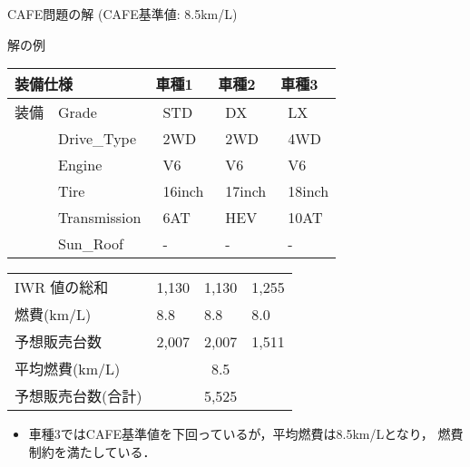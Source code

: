 \documentclass[dvipdfmx, 11pt]{beamer}
\begin{document}
\begin{frame}{CAFE問題の解 {\normalsize (CAFE基準値: 8.5km/L)}}\small
 \begin{exampleblock}{解の例}
  \centering
  \renewcommand{\arraystretch}{0.9}
  \begin{tabular}{p{10mm}|p{25mm}|p{15mm}|p{15mm}|p{15mm}} 
   \multicolumn{2}{l|}{装備仕様}  & 車種1 & 車種2 & 車種3 \\\hline
   装備 & Grade  & \ STD & \ DX  & \ LX\\
   &Drive\_Type  & \ 2WD    & \ 2WD    & \ 4WD\\
   &Engine	     & \ V6      & \ V6     & \ V6\\
   &Tire	     & \ 16inch & \ 17inch & \ 18inch\\
   &Transmission & \ 6AT     & \ HEV     & \ 10AT\\
   &Sun\_Roof    & \ -               & \ -   & \ -  
  \end{tabular}
 \end{exampleblock}

 \pause

 \begin{block}{}
  \centering
  \renewcommand{\arraystretch}{0.9}
  \begin{tabular}{p{38mm}|p{15mm}|p{15mm}|p{15mm}} 
   IWR 値の総和           & 1,130  & 1,130   & 1,255 \\ %
   燃費(km/L)      & 8.8  & 8.8     & 8.0 \\ %
   予想販売台数    & 2,007   & 2,007   & 1,511  \\ \hline
   平均燃費(km/L)  & \multicolumn{3}{c}{8.5} \\ 
   予想販売台数(合計)  & \multicolumn{3}{c}{5,525} 
  \end{tabular}
 \end{block}

 \vfill
 \begin{itemize}
 \item 車種3ではCAFE基準値を下回っているが，平均燃費は8.5km/Lとなり，
       燃費制約を満たしている．
 \end{itemize}
\end{frame}
\end{document}
